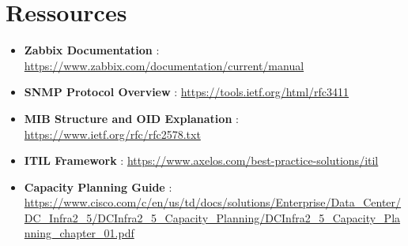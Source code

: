 \newpage

\section*{Ressources}

\begin{itemize}
	\item \textbf{Zabbix Documentation} : \url{https://www.zabbix.com/documentation/current/manual}
	\item \textbf{SNMP Protocol Overview} : \url{https://tools.ietf.org/html/rfc3411}
	\item \textbf{MIB Structure and OID Explanation} : \url{https://www.ietf.org/rfc/rfc2578.txt}
	\item \textbf{ITIL Framework} : \url{https://www.axelos.com/best-practice-solutions/itil}
	\item \textbf{Capacity Planning Guide} : \url{https://www.cisco.com/c/en/us/td/docs/solutions/Enterprise/Data_Center/DC_Infra2_5/DCInfra2_5_Capacity_Planning/DCInfra2_5_Capacity_Planning_chapter_01.pdf}
\end{itemize}